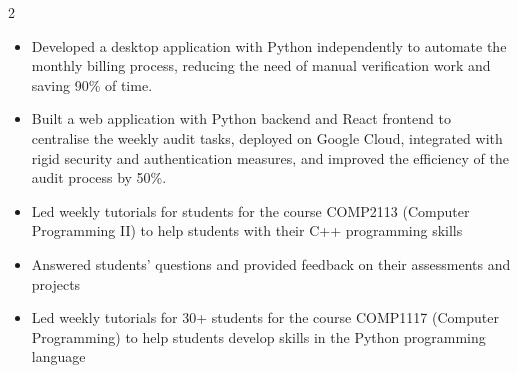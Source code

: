 \documentclass[10pt,a4paper,withhypeper,normalphoto]{altacv}
\begin{document}
\begin{paracol}{2}


\begin{itemize}
  \item Developed a desktop application with Python independently to automate the monthly billing process, reducing the need of manual verification work and saving 90\% of time.
  \item Built a web application with Python backend and React frontend to centralise the weekly audit tasks, deployed on Google Cloud, integrated with rigid security and authentication measures, and improved the efficiency of the audit process by 50\%.
\end{itemize}

\divider

\begin{itemize}
  \item Led weekly tutorials for students for the course COMP2113 (Computer Programming II) to help students with their C++ programming skills
  \item Answered students' questions and provided feedback on their assessments and projects
  \item Led weekly tutorials for 30+ students for the course COMP1117 (Computer Programming) to help students develop skills in the Python programming language
\end{itemize}

\divider




\end{paracol}
\end{document}
